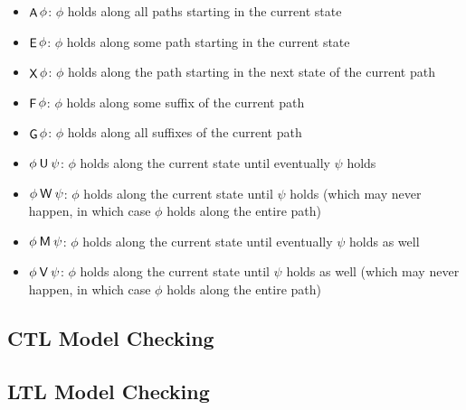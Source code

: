 \begin{itemize}
\item $\mathop{\mathsf{A}} \phi$: $\phi$ holds along all paths starting in the current state
\item $\mathop{\mathsf{E}} \phi$: $\phi$ holds along some path starting in the current state
\item $\mathop{\mathsf{X}} \phi$: $\phi$ holds along the path starting in the next state of
  the current path
\item $\mathop{\mathsf{F}} \phi$: $\phi$ holds along some suffix of the current path
\item $\mathop{\mathsf{G}} \phi$: $\phi$ holds along all suffixes of the current path
\item $\phi \mathbin{\mathsf{U}} \psi$: $\phi$ holds along the current state until eventually
  $\psi$ holds
\item $\phi \mathbin{\mathsf{W}} \psi$: $\phi$ holds along the current state until
  $\psi$ holds (which may never happen, in which case $\phi$ holds along the
  entire path)
\item $\phi \mathbin{\mathsf{M}} \psi$: $\phi$ holds along the current state until eventually
  $\psi$ holds as well
\item $\phi \mathbin{\mathsf{V}} \psi$: $\phi$ holds along the current state until $\psi$ holds
  as well (which may never happen, in which case $\phi$ holds along the entire
  path)
\end{itemize}

\subsection{CTL Model Checking}

\subsection{LTL Model Checking}
